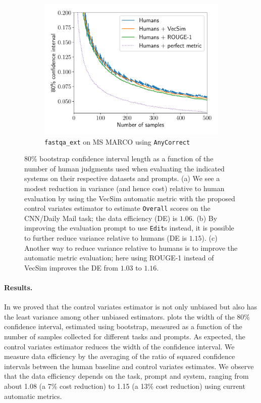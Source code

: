 \begin{figure}[!p]
  \begin{subfigure}[b]{0.6\textwidth}
  \includegraphics[width=\textwidth]{figures/msmarco_trajectory}
  \caption{\label{fig:trajectory-c}\texttt{fastqa\_ext} on MS MARCO using \texttt{AnyCorrect}}
  \end{subfigure}

  \caption[Confidence intervals as a function of the number of human judgments used when evaluating systems]{\label{fig:trajectory} 80\% bootstrap confidence interval length as a function of the number of human judgments used when evaluating the indicated systems on their respective datasets and prompts.
  (a) We see a modest reduction in variance (and hence cost) relative to human evaluation by using the VecSim automatic metric with the proposed control variates estimator to estimate \texttt{Overall} scores on the CNN/Daily Mail task; the data efficiency (DE) is $1.06$.
  (b) By improving the evaluation prompt to use \texttt{Edit}s instead, it is possible to further reduce variance relative to humans (DE is $1.15$).
  (c) Another way to reduce variance relative to humans is to improve the automatic metric evaluation; here using ROUGE-1 instead of VecSim improves the DE from $1.03$ to $1.16$.
  }
\end{figure}

\paragraph{Results.}

In  we proved that the control variates estimator is not only unbiased but also has the least variance among other unbiased estimators.
 plots the width of the 80\% confidence interval, estimated using bootstrap, measured as a function of the number of samples collected for different tasks and prompts.
As expected, the control variates estimator reduces the width of the confidence interval. 
We measure data efficiency by the averaging of the ratio of squared confidence intervals between the human baseline and control variates estimates.
We observe that the data efficiency depends on the task, prompt and system, ranging from about 1.08 (a 7\% cost reduction) to 1.15 (a 13\% cost reduction) using current automatic metrics.

